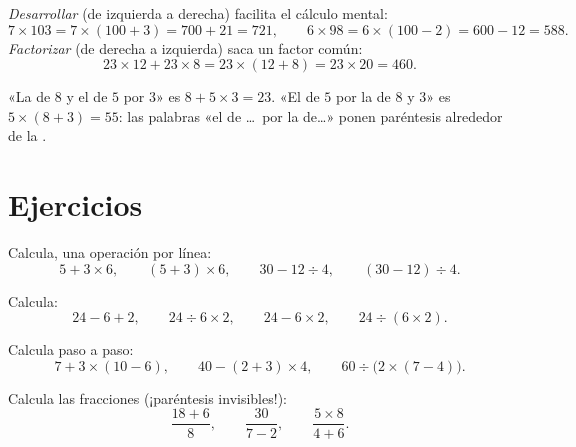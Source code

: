 \begin{example}\label{ex:g7:priorities:distributivity}
\emph{Desarrollar} (de izquierda a derecha) facilita el cálculo mental:
\[
7 \times 103 = 7 \times (100 + 3) = 700 + 21 = 721,
\qquad
6 \times 98 = 6 \times (100 - 2) = 600 - 12 = 588 .
\]
\emph{Factorizar} (de derecha a izquierda) saca un factor común:
\[
23 \times 12 + 23 \times 8 = 23 \times (12 + 8) = 23 \times 20 = 460 .
\]
\end{example}

\begin{example}\label{ex:g7:priorities:words}
«La  de $8$ y el  de $5$ por $3$» es $8 + 5 \times 3 =
23$. «El  de $5$ por la  de $8$ y $3$» es
$5 \times (8 + 3) = 55$: las palabras «el  de \dots\ por la 
de\dots» ponen paréntesis alrededor de la .
\end{example}

\section{Ejercicios}

\begin{exercise}[$\star$]\label{exo:g7:priorities:1}
Calcula, una operación por línea:
\[
5 + 3 \times 6, \qquad
(5 + 3) \times 6, \qquad
30 - 12 \div 4, \qquad
(30 - 12) \div 4 .
\]
\end{exercise}

\begin{exercise}[$\star$]\label{exo:g7:priorities:2}
Calcula:
\[
24 - 6 + 2, \qquad
24 \div 6 \times 2, \qquad
24 - 6 \times 2, \qquad
24 \div (6 \times 2).
\]
\end{exercise}

\begin{exercise}[$\star$]\label{exo:g7:priorities:3}
Calcula paso a paso:
\[
7 + 3 \times (10 - 6), \qquad
40 - (2 + 3) \times 4, \qquad
60 \div \bigl(2 \times (7 - 4)\bigr).
\]
\end{exercise}

\begin{exercise}[$\star$]\label{exo:g7:priorities:4}
Calcula las fracciones (¡paréntesis invisibles!):
\[
\frac{18 + 6}{8}, \qquad
\frac{30}{7 - 2}, \qquad
\frac{5 \times 8}{4 + 6} .
\]
\end{exercise}

